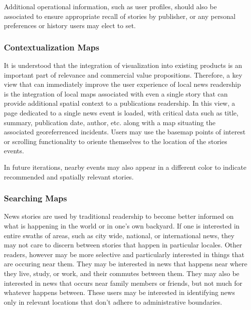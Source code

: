 Additional operational information, such as user profiles, should also be associated to ensure appropriate recall of stories by publisher, or any personal preferences or history users may elect to set.

\subsubsection{Contextualization Maps}
It is understood that the integration of visualization into existing products is an important part of relevance and commercial value propositions\cite{Meeks2019}. Therefore, a key view that can immediately improve the user experience of local news readership is the integration of local maps associated with even a single story that can provide additional spatial context to a publications readership. %
In this view, a page dedicated to a single news event is loaded, with critical data such as title, summary, publication date, author, etc. along with a map situating the associated georeferrenced incidents. Users may use the basemap points of interest or scrolling functionality to oriente themselves to the location of the stories events.

In future iterations, nearby events may also appear in a different color to indicate recommended and spatially relevant stories.

\subsubsection{Searching Maps}
News stories are used by traditional readership to become better informed on what is happening in the world or in one's own backyard. If one is interested in entire swaths of areas, such as city wide, national, or international news, they may not care to discern between stories that happen in particular locales. Other readers, however may be more selective and particularly interested in things that are occuring near them. They may be interested in news that happens near where they live, study, or work, and their commutes between them. They may also be interested in news that occurs near family members or friends, but not much for whatever happens between. These users may be interested in identifying news only in relevant locations that don't adhere to administrative boundaries.

